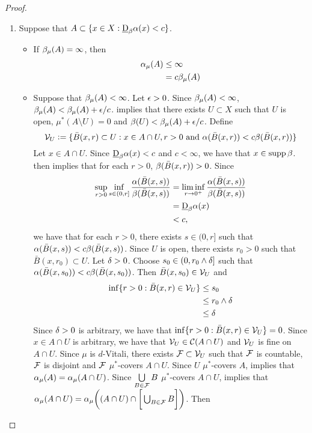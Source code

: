 \documentclass{book}
\begin{document}
	\begin{proof}\
		\begin{enumerate}
			\item Suppose that $A \subset \{x \in X: \underbar{D}_{\beta}\alpha(x) < c\}$. 
			\begin{itemize}
				\item If $\beta_{\mu}(A) = \infty$, then 
				\begin{align*}
					\alpha_{\mu}(A)
					&  \leq \infty \\
					& = c \beta_{\mu}(A)
				\end{align*}
				\item Suppose that $\beta_{\mu}(A) < \infty$. Let $\epsilon >0$. Since $\beta_{\mu}(A) < \infty$, $\beta_{\mu}(A) < \beta_{\mu}(A) + \epsilon/c$.  implies that there exists $U \subset X$ such that $U$ is open, $\mu^*(A \setminus U) = 0$ and $\beta(U) < \beta_{\mu}(A) + \epsilon/c$. Define 
				$$\mathcal{V}_{U} \vcentcolon= \{\bar{B}(x, r) \subset U: x \in A \cap U, r > 0 \text{ and } \alpha( \bar{B}(x, r)) < c \beta( \bar{B}(x, r))\}$$
				Let $x \in A \cap U$. Since $\underbar{D}_{\beta}\alpha(x) < c$ and $c < \infty$, we have that $x \in \operatorname{supp} \beta$.  then implies that for each $r > 0$, $\beta(\bar{B}(x, r)) > 0$. Since 
				\begin{align*}
					\sup_{r>0} \inf_{s \in (0, r]} \frac{ \alpha(\bar{B}(x, s)) }{ \beta(\bar{B}(x, s)) }
					& = \liminf_{r \rightarrow 0^+} \frac{ \alpha(\bar{B}(x, s)) }{ \beta(\bar{B}(x, s)) } \\
					& = \underbar{D}_{\beta}\alpha(x) \\
					& < c, 
				\end{align*}
				we have that for each $r > 0$, there exists $s \in (0, r]$ such that $\alpha(\bar{B}(x, s)) < c \beta(\bar{B}(x, s))$. Since $U$ is open, there exists $r_0 > 0$ such that $\bar{B}(x, r_0) \subset U$. Let $\delta > 0$. Choose $s_0 \in (0, r_0 \wedge \delta]$ such that $\alpha(\bar{B}(x, s_0)) < c \beta(\bar{B}(x, s_0))$. Then $\bar{B}(x, s_0) \in \mathcal{V}_U$ and 
				\begin{align*}
					\inf \{r > 0: \bar{B}(x, r) \in \mathcal{V}_U\}
					& \leq s_0 \\
					& \leq r_0 \wedge \delta \\
					& \leq \delta
				\end{align*} 
				Since $\delta >0$ is arbitrary, we have that $\inf \{r > 0: \bar{B}(x, r) \in \mathcal{V}_U\} = 0$. Since $x \in A \cap U$ is arbitrary, we have that $\mathcal{V}_U \in \mathcal{C}(A \cap U)$ and $\mathcal{V}_U$ is fine on $A \cap U$. Since $\mu$ is $d$-Vitali, there exists $\mathcal{F} \subset \mathcal{V}_U$ such that $\mathcal{F}$ is countable, $\mathcal{F}$ is disjoint and $\mathcal{F}$ $\mu^*$-covers $A \cap U$. Since $U$ $\mu^*$-covers $A$,  implies that $\alpha_{\mu}(A) = \alpha_{\mu}(A \cap U)$. Since $\bigcup\limits_{B \in \mathcal{F}} B$ $\mu^*$-covers $A \cap U$,  implies that $\alpha_{\mu} (A \cap U) = \alpha_{\mu} \bigg((A \cap U) \cap \bigg[ \bigcup_{B \in \mathcal{F}} B \bigg] \bigg)$. Then

\end{itemize}
\end{enumerate}
\end{proof}
\end{document}
